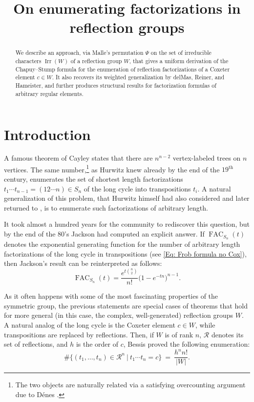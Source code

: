 \documentclass[ALCO, Unicode]{cedram}
\title
{On enumerating factorizations in reflection groups}
\author[\initial{T.} Douvropoulos]{\firstname{Theo} \lastname{Douvropoulos}}
\newcommand{\op}[1]{\operatorname{#1}}
\newcommand{\op}[1]{\operatorname{#1}}
\begin{document}
\begin{abstract}
We describe an approach, via Malle's permutation $\Psi$ on the set of irreducible characters $\op{Irr}(W)$ of a reflection group $W$, that gives a uniform derivation of the Chapuy--Stump formula for the enumeration of reflection factorizations of a Coxeter element $c \in W$. It also recovers its weighted generalization by delMas, Reiner, and Hameister, and further produces structural results for factorization formulas of arbitrary regular elements. 
\end{abstract}


\maketitle


\section{Introduction}

A famous theorem of Cayley states that there are $n^{n-2}$ vertex-labeled trees on $n$ vertices. The same number,\footnote{The two objects are naturally related via a satisfying overcounting argument due to D{\'e}nes \cite{denes-first-paper}.} as Hurwitz knew \cite{hurwitz-1891-paper} already by the end of the $19^{\text{th}}$ century, enumerates the set of shortest length factorizations $t_1\cdots t_{n-1}=(12\cdots n)\in S_n$ of the long cycle into transpositions $t_i$. A natural generalization of this problem, that Hurwitz himself had also considered and later returned to \cite{hurwitz-1901-paper}, is to enumerate such factorizations of arbitrary length.

It took almost a hundred years for the community to rediscover this question, but by the end of the 80's Jackson \cite[Corol.~4.2]{jackson-first-proof-of-arb-length} had computed an explicit answer. If $\op{FAC}_{S_n}(t)$ denotes the exponential generating function for the number of arbitrary length factorizations of the long cycle in transpositions (see \eqref{Eq: Frob formula no Cox}), then Jackson's result can be reinterpreted as follows: \begin{equation}
\op{FAC}_{S_n}(t)=\dfrac{e^{t\binom{n}{2}}}{n!}\big( 1-e^{-tn}\big)^{n-1}.\label{EQ: Jackson's formula}
\end{equation}

As it often happens with some of the most fascinating properties of the symmetric group, the previous statements are special cases of theorems that hold for more general (in this case, the complex, well-generated) reflection groups $W$. A natural analog of the long cycle is the Coxeter element $c\in W$, while transpositions are replaced by reflections. Then, if $W$ is of rank $n$, $\mathcal{R}$ denotes its set of reflections, and $h$ is the order of $c$, Bessis \cite[Prop.~7.6]{bes-kpi1} proved the following enumeration: \begin{equation}
\#\Big\{ (t_1,\ldots,t_n)\in \mathcal{R}^n\ |\ t_1\cdots t_n=c\Big\}\ =\ \dfrac{h^nn!}{|W|}.\label{EQ: Hurwitz number for W}
\end{equation}
\end{document}

